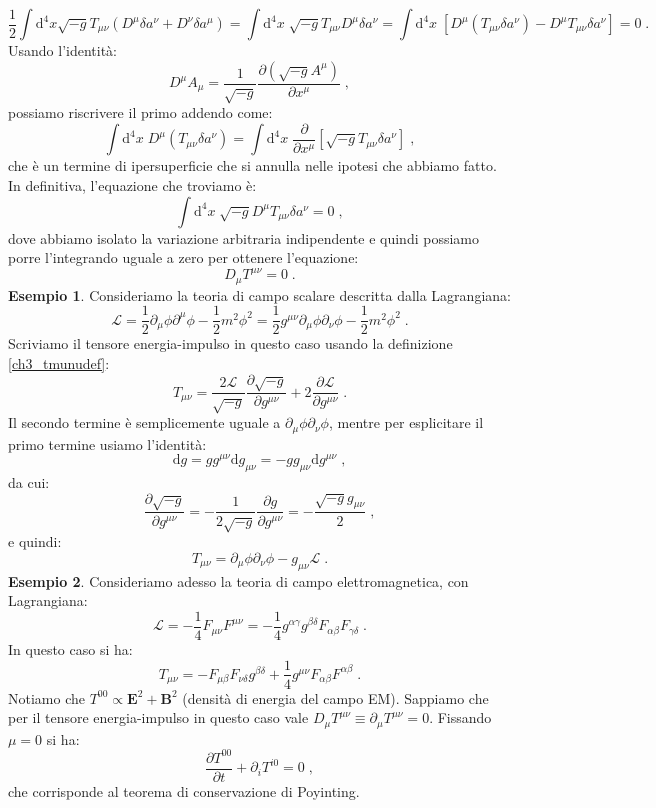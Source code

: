 \documentclass[12pt,a4paper]{report}
\theoremstyle{definition}
\newcommand{\lag}{\mathcal{L}}
\newcommand{\diff}[1][]{\mathrm{d}#1}
\begin{document}
$$
\frac{1}{2}\int\diff^4{x}\sqrt{-g}T_{\mu\nu}(D^{\mu}\delta a^{\nu}+D^{\nu}\delta a^{\mu})=\int\diff^4{x}\;\sqrt{-g}T_{\mu\nu}D^{\mu}\delta a^{\nu}=\int\diff^4{x}\;\left[D^{\mu}(T_{\mu\nu}\delta a^{\nu})-D^{\mu}T_{\mu\nu}\delta a^{\nu}\right]=0\;.
$$
Usando l'identità:
\begin{equation}
D^{\mu}A_{\mu}=\frac{1}{\sqrt{-g}}\frac{\partial(\sqrt{-g}A^{\mu})}{\partial x^{\mu}}\;,
\end{equation}
possiamo riscrivere il primo addendo come:
\begin{equation}
\int\diff^4{x}\; D^{\mu}(T_{\mu\nu}\delta a^{\nu})=\int\diff^4{x}\;\frac{\partial}{\partial x^{\mu}}\left[\sqrt{-g}T_{\mu\nu}\delta a^{\nu}\right]\;,
\end{equation}
che è un termine di ipersuperficie che si annulla nelle ipotesi che abbiamo fatto. In definitiva, l'equazione che troviamo è:
\begin{equation}
\int\diff^4{x}\;\sqrt{-g}D^{\mu}T_{\mu\nu}\delta a^{\nu}=0\;,
\end{equation}
dove abbiamo isolato la variazione arbitraria indipendente e quindi possiamo porre l'integrando uguale a zero per ottenere l'equazione:
\begin{equation}
D_{\mu}T^{\mu\nu}=0\;.
\end{equation}
\textbf{Esempio 1}. Consideriamo la teoria di campo scalare descritta dalla Lagrangiana:
$$
\lag=\frac{1}{2}\partial_{\mu}\phi\partial^{\mu}\phi-\frac{1}{2}m^2\phi^2=\frac{1}{2}g^{\mu\nu}\partial_{\mu}\phi\partial_{\nu}\phi-\frac{1}{2}m^2\phi^2\;.
$$
Scriviamo il tensore energia-impulso in questo caso usando la definizione \eqref{ch3_tmunudef}:
$$
T_{\mu\nu}=\frac{2\lag}{\sqrt{-g}}\frac{\partial \sqrt{-g}}{\partial g^{\mu\nu}}+2\frac{\partial \lag}{\partial g^{\mu\nu}}\;.
$$
Il secondo termine è semplicemente uguale a $\partial_{\mu}\phi\partial_{\nu}\phi$, mentre per esplicitare il primo termine usiamo l'identità:
\begin{equation}
\diff{g}=gg^{\mu\nu}\diff{g_{\mu\nu}}=-gg_{\mu\nu}\diff{g^{\mu\nu}}\;,
\end{equation}
da cui:
$$
\frac{\partial \sqrt{-g}}{\partial g^{\mu\nu}}=-\frac{1}{2\sqrt{-g}}\frac{\partial g}{\partial g^{\mu\nu}}=-\frac{\sqrt{-g}g_{\mu\nu}}{2}\;,
$$
e quindi:
$$
T_{\mu\nu}=\partial_{\mu}\phi\partial_{\nu}\phi-g_{\mu\nu}\lag\;.
$$
\textbf{Esempio 2}. Consideriamo adesso la teoria di campo elettromagnetica, con Lagrangiana:
$$
\lag=-\frac{1}{4}F_{\mu\nu}F^{\mu\nu}=-\frac{1}{4}g^{\alpha\gamma}g^{\beta\delta}F_{\alpha\beta}F_{\gamma\delta}\;.
$$
In questo caso si ha:
$$
T_{\mu\nu}=-F_{\mu\beta}F_{\nu\delta}g^{\beta\delta}+\frac{1}{4}g^{\mu\nu}F_{\alpha\beta}F^{\alpha\beta}\;.
$$
Notiamo che $T^{00}\propto \mathbf{E}^2+\mathbf{B}^2$ (densità di energia del campo EM). Sappiamo che per il tensore energia-impulso in questo caso vale $D_{\mu}T^{\mu\nu}\equiv \partial_{\mu}T^{\mu\nu}=0$. Fissando $\mu=0$ si ha:
$$
\frac{\partial T^{00}}{\partial t}+\partial_iT^{i0}=0\;,
$$
che corrisponde al teorema di conservazione di Poyinting.
\end{document}
